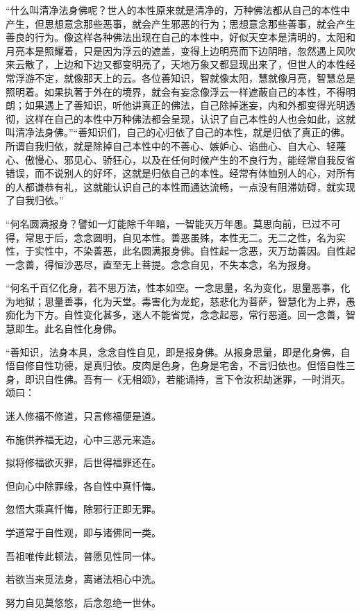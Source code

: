 \documentclass[12pt,twoside,openany]{book}
\begin{document}
{“什么叫清净法身佛呢？世人的本性原来就是清净的，万种佛法都从自己的本性中产生，但思想意念那些恶事，就会产生邪恶的行为；思想意念那些善事，就会产生善良的行为。像这样各种佛法出现在自己的本性中，好似天空本是清明的，太阳和月亮本是照耀着，只是因为浮云的遮盖，变得上边明亮而下边阴暗，忽然遇上风吹来云散了，上边和下边又都变明亮了，天地万象又都显现出来了，但世人的本性经常浮游不定，就像那天上的云。各位善知识，智就像太阳，慧就像月亮，智慧总是照明着。如果执著于外在的境界，就会有妄念像浮云一样遮蔽自己的本性，不得明朗；如果遇上了善知识，听他讲真正的佛法，自己除掉迷妄，内和外都变得光明透彻，这样在自己的本性中万种佛法都会呈现，认识了自己本性的人也会如此，这就叫清净法身佛。”“善知识们，自己的心归依了自己的本性，就是归依了真正的佛。所谓自我归依，就是除掉自己本性中的不善心、嫉妒心、谄曲心、自大心、轻蔑心、傲慢心、邪见心、骄狂心，以及在任何时候产生的不良行为，能经常自我反省错误，而不说别人的好坏，这就是归依自己的本性。经常有体恤别人的心，对所有的人都谦恭有礼，这就能认识自己的本性而通达流畅，一点没有阻滞妨碍，就实现了自我归依。”}

“何名圆满报身？譬如{\color{red}一灯能除千年暗，一智能灭万年愚。}莫思向前，已过不可得，常思于后，念念圆明，自见本性。善恶虽殊，本性无二。无二之性，名为实性，于实性中，不染善恶，此名圆满报身佛。自性起一念恶，灭万劫善因。自性起一念善，得恒沙恶尽，直至无上菩提。念念自见，不失本念，名为报身。

“何名千百亿化身，若不思万法，性本如空。一念思量，名为变化，思量恶事，化为地狱；思量善事，化为天堂。毒害化为龙蛇，慈悲化为菩萨，智慧化为上界，愚痴化为下方。自性变化甚多，迷人不能省觉，念念起恶，常行恶道。回一念善，智慧即生。此名自性化身佛。

“善知识，法身本具，念念自性自见，即是报身佛。从报身思量，即是化身佛，自悟自修自性功德，是真归依。皮肉是色身，色身是宅舍，不言归依也。但悟自性三身，即识自性佛。吾有一《无相颂》，若能诵持，言下令汝积劫迷罪，一时消灭。颂曰：

迷人修福不修道，只言修福便是道。

布施供养福无边，心中三恶元来造。

拟将修福欲灭罪，后世得福罪还在。

但向心中除罪缘，各自性中真忏悔。

忽悟大乘真忏悔，除邪行正即无罪。

学道常于自性观，即与诸佛同一类。

吾祖唯传此顿法，普愿见性同一体。

若欲当来觅法身，离诸法相心中洗。

努力自见莫悠悠，后念忽绝一世休。
\end{document}
